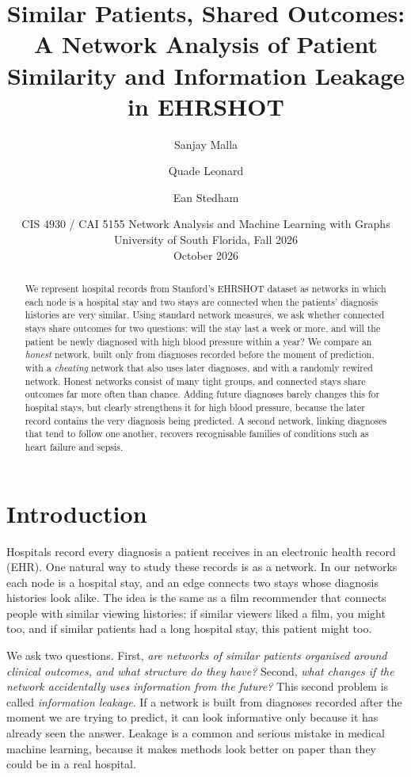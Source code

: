 \documentclass[11pt]{article}
\title{Similar Patients, Shared Outcomes:\\
A Network Analysis of Patient Similarity and Information Leakage in EHRSHOT}
\author{Sanjay Malla \and Quade Leonard \and Ean Stedham}
\date{CIS 4930 / CAI 5155 Network Analysis and Machine Learning with Graphs\\
University of South Florida, Fall 2026\\[4pt]
October 2026}
\begin{document}
\maketitle

\begin{abstract}
We represent hospital records from Stanford's EHRSHOT dataset as networks in which each node is a hospital stay and two stays are connected when the patients' diagnosis histories are very similar. Using standard network measures, we ask whether connected stays share outcomes for two questions: will the stay last a week or more, and will the patient be newly diagnosed with high blood pressure within a year? We compare an \emph{honest} network, built only from diagnoses recorded before the moment of prediction, with a \emph{cheating} network that also uses later diagnoses, and with a randomly rewired network. Honest networks consist of many tight groups, and connected stays share outcomes far more often than chance. Adding future diagnoses barely changes this for hospital stays, but clearly strengthens it for high blood pressure, because the later record contains the very diagnosis being predicted. A second network, linking diagnoses that tend to follow one another, recovers recognisable families of conditions such as heart failure and sepsis.
\end{abstract}

\section{Introduction}

Hospitals record every diagnosis a patient receives in an electronic health record (EHR). One natural way to study these records is as a network. In our networks each node is a hospital stay, and an edge connects two stays whose diagnosis histories look alike. The idea is the same as a film recommender that connects people with similar viewing histories: if similar viewers liked a film, you might too, and if similar patients had a long hospital stay, this patient might too.

We ask two questions. First, \emph{are networks of similar patients organised around clinical outcomes, and what structure do they have?} Second, \emph{what changes if the network accidentally uses information from the future?} This second problem is called \emph{information leakage}. If a network is built from diagnoses recorded after the moment we are trying to predict, it can look informative only because it has already seen the answer. Leakage is a common and serious mistake in medical machine learning, because it makes methods look better on paper than they could be in a real hospital.
\end{document}
